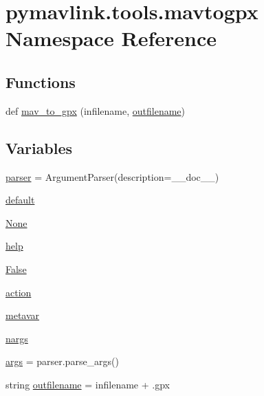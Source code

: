 \hypertarget{namespacepymavlink_1_1tools_1_1mavtogpx}{}\section{pymavlink.\+tools.\+mavtogpx Namespace Reference}
\label{namespacepymavlink_1_1tools_1_1mavtogpx}
\subsection*{Functions}
\begin{DoxyCompactItemize}
\item 
def \mbox{\hyperlink{namespacepymavlink_1_1tools_1_1mavtogpx_a76a1d5d7118b71ed2aea6781eedc6d13}{mav\+\_\+to\+\_\+gpx}} (infilename, \mbox{\hyperlink{namespacepymavlink_1_1tools_1_1mavtogpx_a4916c147b615073bbdb8b018d8dab198}{outfilename}})
\end{DoxyCompactItemize}
\subsection*{Variables}
\begin{DoxyCompactItemize}
\item 
\mbox{\hyperlink{namespacepymavlink_1_1tools_1_1mavtogpx_aee884cdb38da103bca5341f48d1d015b}{parser}} = Argument\+Parser(description=\+\_\+\+\_\+doc\+\_\+\+\_\+)
\item 
\mbox{\hyperlink{namespacepymavlink_1_1tools_1_1mavtogpx_ac5b99720e8f6855ef8315f9e4bdae561}{default}}
\item 
\mbox{\hyperlink{namespacepymavlink_1_1tools_1_1mavtogpx_ab5db6f213f5a8a527a64975e14900dc8}{None}}
\item 
\mbox{\hyperlink{namespacepymavlink_1_1tools_1_1mavtogpx_a4c8eb575a67b1b5635c4ac22fc712a67}{help}}
\item 
\mbox{\hyperlink{namespacepymavlink_1_1tools_1_1mavtogpx_aa496297c4a07f9ae61ef7a7a82100180}{False}}
\item 
\mbox{\hyperlink{namespacepymavlink_1_1tools_1_1mavtogpx_a5b8088a7b7159e3846832a309ab5a03d}{action}}
\item 
\mbox{\hyperlink{namespacepymavlink_1_1tools_1_1mavtogpx_a30348df9231afcb612b9933aa296e8bb}{metavar}}
\item 
\mbox{\hyperlink{namespacepymavlink_1_1tools_1_1mavtogpx_ad7d5fac4c52f35175d02800faa848299}{nargs}}
\item 
\mbox{\hyperlink{namespacepymavlink_1_1tools_1_1mavtogpx_ac7465ef4c3b1b2e98d64226d60feb554}{args}} = parser.\+parse\+\_\+args()
\item 
string \mbox{\hyperlink{namespacepymavlink_1_1tools_1_1mavtogpx_a4916c147b615073bbdb8b018d8dab198}{outfilename}} = infilename + \textquotesingle{}.gpx\textquotesingle{}
\end{DoxyCompactItemize}


